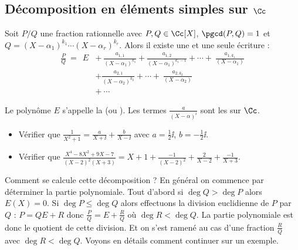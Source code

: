 \documentclass[class=report,crop=false]{standalone}
\begin{document}
\subsection{Décomposition en éléments simples sur $\Cc$}


\begin{theoreme}
Soit $P/Q$ une fraction rationnelle avec $P,Q \in \Cc[X]$, $\pgcd(P,Q)=1$ et
$Q=(X-\alpha_1)^{k_1}\cdots(X-\alpha_r)^{k_r}$.
Alors il existe une et une seule écriture :
$$\begin{array}{rl}
\displaystyle \frac{P}{Q} \  =  \ \  E  & + \
 \displaystyle  \frac{a_{1,1}}{(X-\alpha_1)^{k_1}}+\frac{a_{1,2}}{(X-\alpha_1)^{k_1-1}}+\cdots
+\ \frac{a_{1,k_1}}{(X-\alpha_1)} \\[4mm]
  & \displaystyle+ \frac{a_{2,1}}{(X-\alpha_2)^{k_2}}+\cdots
+\ \frac{a_{2,k_2}}{(X-\alpha_2)} \\[3mm]
 & + \ \cdots
\end{array}$$
\end{theoreme}

Le polynôme $E$ s'appelle la  
(ou \defi{partie entière}).
Les termes $\frac{a}{(X-\alpha)^i}$ sont les  sur $\Cc$.


\begin{exemple}
\sauteligne
\begin{itemize}
  \item Vérifier que $\frac{1}{X^2+1} = \frac{a}{X+\ii} + \frac{b}{X-\ii}$ avec $a=\frac12 \ii$, $b=-\frac12\ii$.
  \item Vérifier que  $\frac{X^4-8X^2+9X-7}{(X-2)^2(X+3)}= X+1 + \frac{-1}{(X-2)^2} + \frac{2}{X-2} + \frac{-1}{X+3}$.
\end{itemize}
\end{exemple}


Comment se calcule cette décomposition ?
En général on commence par déterminer la partie polynomiale.
Tout d'abord si $\deg Q > \deg P$ alors $E(X)=0$.
Si $\deg P \le \deg Q$ alors effectuons la division euclidienne de $P$ par $Q$ :
$P=QE+R$ donc $\frac{P}{Q} = E + \frac{R}{Q}$
où $\deg R < \deg Q$.
La partie polynomiale est donc le quotient de cette division.
Et on s'est ramené au cas d'une fraction $\frac{R}{Q}$ avec $\deg R < \deg Q$.
Voyons en détails comment continuer sur un exemple.
\end{document}
